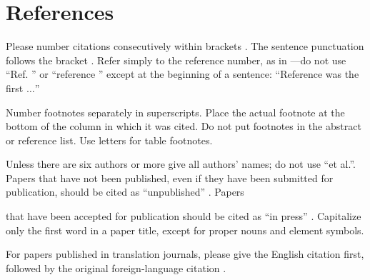 \documentclass[conference]{IEEEtran}
\begin{document}
\section*{References}

Please number citations consecutively within brackets \cite{b1}. The
sentence punctuation follows the bracket \cite{b2}. Refer simply to the
reference
number, as in \cite{b3}---do not use ``Ref. \cite{b3}'' or ``reference
\cite{b3}'' except at
the beginning of a sentence: ``Reference \cite{b3} was the first $\ldots$''

Number footnotes separately in superscripts. Place the actual footnote at
the bottom of the column in which it was cited. Do not put footnotes in the
abstract or reference list. Use letters for table footnotes.

Unless there are six authors or more give all authors' names; do not use
``et al.''. Papers that have not been published, even if they have been
submitted for publication, should be cited as ``unpublished'' \cite{b4}. Papers

that have been accepted for publication should be cited as ``in press''
\cite{b5}.
Capitalize only the first word in a paper title, except for proper nouns and
element symbols.

For papers published in translation journals, please give the English
citation first, followed by the original foreign-language citation \cite{b6}.
\end{document}
